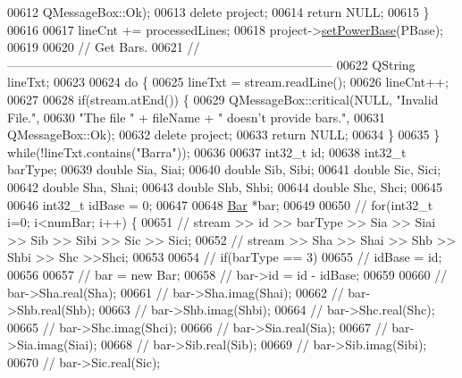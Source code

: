 \begin{DoxyCode}
00612                           QMessageBox::Ok);
00613     \textcolor{keyword}{delete} project;
00614     \textcolor{keywordflow}{return} NULL;
00615   \}
00616 
00617   lineCnt += processedLines;
00618   project->\hyperlink{class_project_abb4df805b3cd3af509a41e657eb4bb83}{setPowerBase}(PBase);
00619 
00620 \textcolor{comment}{// Get Bars.}
00621 \textcolor{comment}{//------------------------------------------------------------------------------}
00622   QString lineTxt;
00623 
00624   \textcolor{keywordflow}{do} \{
00625     lineTxt = stream.readLine();
00626     lineCnt++;
00627 
00628     \textcolor{keywordflow}{if}(stream.atEnd()) \{
00629       QMessageBox::critical(NULL, \textcolor{stringliteral}{"Invalid File."},
00630                             \textcolor{stringliteral}{"The file "} + fileName + \textcolor{stringliteral}{" doesn't provide bars."},
00631                             QMessageBox::Ok);
00632       \textcolor{keyword}{delete} project;
00633       \textcolor{keywordflow}{return} NULL;
00634     \}
00635   \} \textcolor{keywordflow}{while}(!lineTxt.contains(\textcolor{stringliteral}{"Barra"}));
00636 
00637   int32\_t id;
00638   int32\_t barType;
00639   \textcolor{keywordtype}{double} Sia, Siai;
00640   \textcolor{keywordtype}{double} Sib, Sibi;
00641   \textcolor{keywordtype}{double} Sic, Sici;
00642   \textcolor{keywordtype}{double} Sha, Shai;
00643   \textcolor{keywordtype}{double} Shb, Shbi;
00644   \textcolor{keywordtype}{double} Shc, Shci;
00645 
00646   int32\_t idBase = 0;
00647 
00648   \hyperlink{class_bar}{Bar} *bar;
00649 
00650 \textcolor{comment}{//  for(int32\_t i=0; i<numBar; i++) \{}
00651 \textcolor{comment}{//    stream >> id >> barType >> Sia >> Siai >> Sib >> Sibi >> Sic >> Sici;}
00652 \textcolor{comment}{//    stream >> Sha >> Shai >> Shb >> Shbi >> Shc >>Shci;}
00653 
00654 \textcolor{comment}{//    if(barType == 3)}
00655 \textcolor{comment}{//      idBase = id;}
00656 
00657 \textcolor{comment}{//    bar = new Bar;}
00658 \textcolor{comment}{//    bar->id = id - idBase;}
00659 
00660 \textcolor{comment}{//    bar->Sha.real(Sha);}
00661 \textcolor{comment}{//    bar->Sha.imag(Shai);}
00662 \textcolor{comment}{//    bar->Shb.real(Shb);}
00663 \textcolor{comment}{//    bar->Shb.imag(Shbi);}
00664 \textcolor{comment}{//    bar->Shc.real(Shc);}
00665 \textcolor{comment}{//    bar->Shc.imag(Shci);}
00666 \textcolor{comment}{//    bar->Sia.real(Sia);}
00667 \textcolor{comment}{//    bar->Sia.imag(Siai);}
00668 \textcolor{comment}{//    bar->Sib.real(Sib);}
00669 \textcolor{comment}{//    bar->Sib.imag(Sibi);}
00670 \textcolor{comment}{//    bar->Sic.real(Sic);}

\end{DoxyCode}
